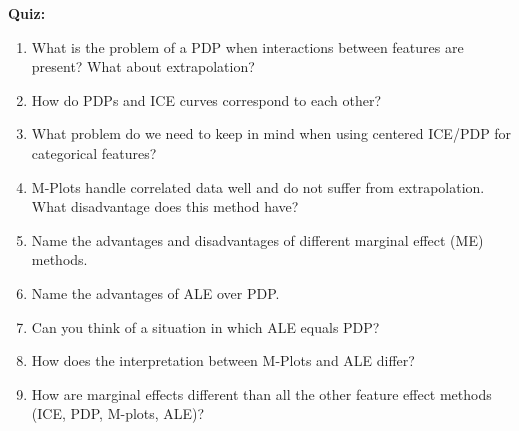 \textbf{Quiz:}
\begin{enumerate}
        
    \item What is the problem of a PDP when interactions between features are present? What about extrapolation?
    \item How do PDPs and ICE curves correspond to each other?
    \item What problem do we need to keep in mind when using centered ICE/PDP for categorical features? 
    \item M-Plots handle correlated data well and do not suffer from extrapolation. What disadvantage does this method have?
    \item Name the advantages and disadvantages of different marginal effect (ME) methods.
    \item Name the advantages of ALE over PDP.
    \item Can you think of a situation in which ALE equals PDP?
    \item How does the interpretation between M-Plots and ALE differ?
    \item How are marginal effects different than all the other feature effect methods (ICE, PDP, M-plots, ALE)?



\end{enumerate}
